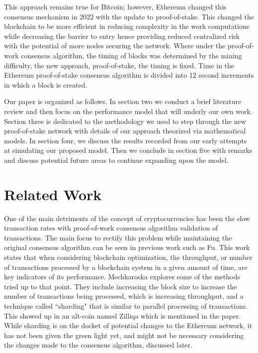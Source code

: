 \documentclass[conference]{IEEEtran}
\begin{document}
This approach remains true for Bitcoin; however, Ethereum changed this consensus 
mechanism in 2022 with the update to proof-of-stake\cite{2022_Ethereum_PoS}. This 
changed the blockchain to be more efficient in reducing complexity in the work 
computations while decreasing the barrier to entry hence providing reduced centralized 
risk with the potential of more nodes securing the network. Where under the proof-of-work
consensus algorithm, the timing of blocks was determined by the mining difficulty, the 
new approach, proof-of-stake, the timing is fixed. Time in the Ethereum proof-of-stake 
consensus algorithm is divided into 12 second increments in which a block is created.

Our paper is organized as follows. In section two we conduct a brief literature review and 
then focus on the performance model that will underly our own work. Section three is 
dedicated to the methodology we used to step through the new proof-of-stake network with details of our 
approach theorized via mathematical models. In section four, we discuss the results recorded 
from our early attempts at simulating our proposed model. Then we conclude in section five 
with remarks and discuss potential future areas to continue expanding upon the model. 

\section{Related Work}\label{related}

One of the main detriments of the concept of cryptocurrencies has been the slow transaction
rates with proof-of-work consensus algorithm validation of transactions. The main focus to rectify 
this problem while maintaining the original consensus algorithm can be seen in previous work such 
as Fu\cite{2020_IEEEToVT_Fu}. This work states that when considering blockchain optimization, 
the throughput, or number of transactions processed by a blockchain system in a given amount of 
time, are key indicators of its performance. Mechkaroska\cite{2018_TELFOR_Mechkaroska} explores
some of the methods tried up to that point. They include increasing the block size to increase the 
number of transactions being processed, which is increasing throughput, and a technique called 
``sharding" that is similar to parallel processing of transactions. This showed up in an alt-coin named 
Zilliqa\cite{2017_Zilliqa_Zilliqa} which is mentioned in the paper. While sharding is on the docket of 
potential changes to the Ethereum network, it has not been given the green light yet, and might not
be necessary considering the changes made to the consensus algorithm, discussed later.
\end{document}
